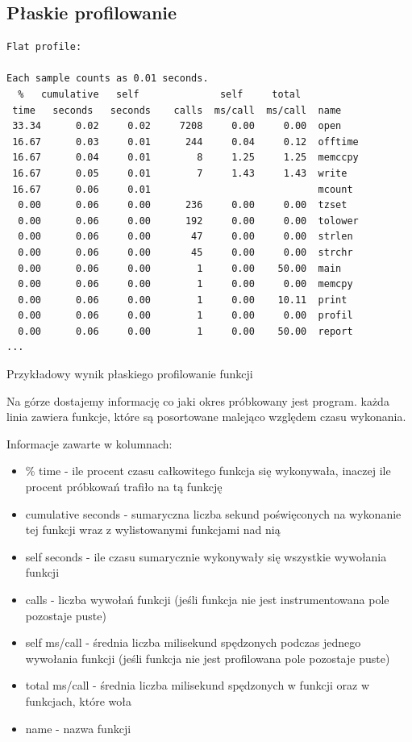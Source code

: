 \documentclass[shortabstract]{iithesis}
\theoremstyle{definition} \newtheorem*{definition}{Definicja}
\theoremstyle{definition} \newtheorem*{example}{Przykład}
\theoremstyle{definition} \newtheorem*{remark}{Uwaga}
\newenvironment{longlisting}{\captionsetup{type=listing}}{}
\begin{document}
\subsection{Płaskie profilowanie}
\begin{longlisting}
  \begin{verbatim}
Flat profile:

Each sample counts as 0.01 seconds.
  %   cumulative   self              self     total           
 time   seconds   seconds    calls  ms/call  ms/call  name    
 33.34      0.02     0.02     7208     0.00     0.00  open
 16.67      0.03     0.01      244     0.04     0.12  offtime
 16.67      0.04     0.01        8     1.25     1.25  memccpy
 16.67      0.05     0.01        7     1.43     1.43  write
 16.67      0.06     0.01                             mcount
  0.00      0.06     0.00      236     0.00     0.00  tzset
  0.00      0.06     0.00      192     0.00     0.00  tolower
  0.00      0.06     0.00       47     0.00     0.00  strlen
  0.00      0.06     0.00       45     0.00     0.00  strchr
  0.00      0.06     0.00        1     0.00    50.00  main
  0.00      0.06     0.00        1     0.00     0.00  memcpy
  0.00      0.06     0.00        1     0.00    10.11  print
  0.00      0.06     0.00        1     0.00     0.00  profil
  0.00      0.06     0.00        1     0.00    50.00  report
...
  \end{verbatim}
  \caption{Przykładowy wynik płaskiego profilowanie funkcji}
  \label{lst:flatprof}
\end{longlisting}

Na górze dostajemy informację co jaki okres próbkowany jest program. każda linia zawiera funkcje, które są posortowane malejąco względem czasu wykonania.

Informacje zawarte w kolumnach:
\begin{itemize}
    \item \% time - ile procent czasu całkowitego funkcja się wykonywała, inaczej ile procent próbkowań trafiło na tą funkcję
    \item cumulative seconds - sumaryczna liczba sekund poświęconych na wykonanie tej funkcji wraz z wylistowanymi funkcjami nad nią
    \item self seconds - ile czasu sumarycznie wykonywały się wszystkie wywołania funkcji
    \item calls - liczba wywołań funkcji (jeśli funkcja nie jest instrumentowana pole pozostaje puste)
    \item self ms/call - średnia liczba milisekund spędzonych podczas jednego wywołania funkcji (jeśli funkcja nie jest profilowana pole pozostaje puste)
    \item total ms/call - średnia liczba milisekund spędzonych w funkcji oraz w funkcjach, które woła
    \item name - nazwa funkcji
\end{itemize}
\end{document}
